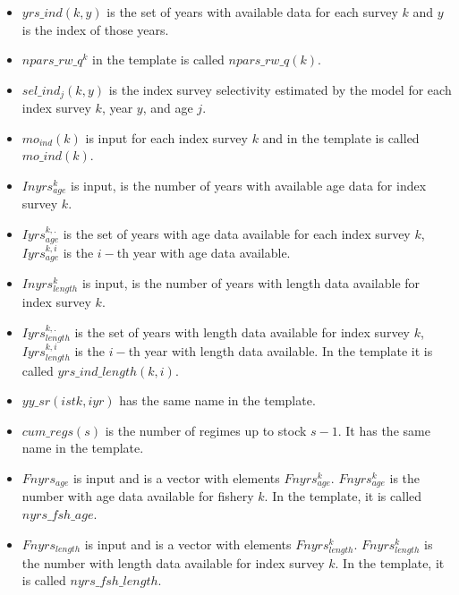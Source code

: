 \documentclass{article}
\begin{document}
\begin{itemize}
    \item $yrs\_ind(k,y)$ is the set of years with available data for each survey $k$ and $y$ is the index of those years.
    \item $npars\_rw\_q^k$ in the template is called $npars\_rw\_q(k)$.
    \item $sel\_ind_j(k,y)$ is the index survey selectivity estimated by the model for each index survey $k$, year $y$, and age $j$. 
    
    \item $mo_{ind}(k)$ is input for each index survey $k$ and in the template is called $mo\_ind(k)$.
    \item $Inyrs^k_{age}$ is input, is the number of years with available age data for index survey $k$.
    \item $Iyrs^{k,.}_{age}$ is the set of years with age data available for each index survey $k$, $Iyrs^{k,i}_{age}$ is the $i-$th year with age data available.
    
    
    
    
    \item $Inyrs^k_{length}$ is input, is the number of years with length data available for index survey $k$.
    \item $Iyrs^{k,.}_{length}$
    is the set of years with length data available for index survey $k$, $Iyrs^{k,i}_{length}$ is the $i-$th year with length data available. In the template it is called $yrs\_ind\_length(k, i)$.
    \item $yy\_sr(istk,iyr)$ has the same name in the template.
    \item $cum\_regs(s)$ is the number of regimes up to stock $s-1$. It has the same name in the template.
    \item $Fnyrs_{age}$ is input and  is a vector with elements $Fnyrs^k_{age}$. $Fnyrs^k_{age}$ is the number with age data available for fishery $k$. In the template, it is called $nyrs\_fsh\_age$.
    \item $Fnyrs_{length}$ is input and  is a vector with elements $Fnyrs^k_{length}$. $Fnyrs^k_{length}$ is the number with length data available for index survey $k$. In the template, it is called $nyrs\_fsh\_length$.
    

\end{itemize}
\end{document}
